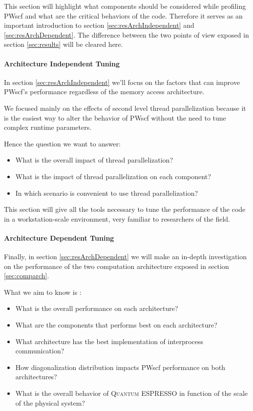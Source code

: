 \documentclass[a4paper,12pt]{article}
\newcommand\QE{\textsc{Quantum} ESPRESSO }
\begin{document}
This section will highlight what components should be considered while profiling PWscf and what are the critical behaviors of the code. 
Therefore it serves as an important introduction to section \ref{sec:resArchIndependent} and \ref{sec:resArchDependent}. The difference between the two points of view exposed in section \ref{sec:results} will be cleared here.



\paragraph{Architecture Independent Tuning}
In section \ref{sec:resArchIndependent} we'll focus on the factors that can improve PWscf's performance regardless of the memory access architecture.

We focused mainly on the effects of second level thread parallelization because it is the easiest way to alter the behavior of PWscf without the need to tune complex runtime parameters.

Hence the question we want to answer:
\begin{itemize}
	\item What is the overall impact of thread parallelization?
	\item What is the impact of thread parallelization on each component?
	\item In which scenario is convenient to use thread parallelization?
\end{itemize}

This section will give all the tools necessary to tune the performance of the code in a workstation-scale environment, very familiar to researchers of the field.

\paragraph{Architecture Dependent Tuning}
Finally, in section \ref{sec:resArchDependent} we will make an in-depth investigation on the performance of the two computation architecture exposed in section \ref{sec:comparch}.

What we aim to know is :
\begin{itemize}
	\item What is the overall performance on each architecture?
	\item What are the components that performs best on each architecture?
	\item What architecture has the best implementation of interprocess communication?
	\item How diagonalization distribution impacts PWscf performance on both architectures?
	\item What is the overall behavior of \QE in function of the scale of the physical system?
\end{itemize}
\end{document}
